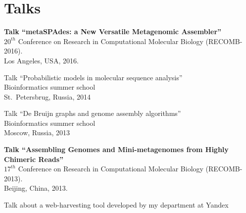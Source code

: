 \section{Talks} %
\begin{innerlist}
 \item \textbf{Talk ``metaSPAdes: a New Versatile Metagenomic Assembler''}\\
       $20^{th}$ Conference on Research in Computational Molecular Biology (RECOMB-2016).\\ 
       Los Angeles, USA, 2016.
 \item Talk ``Probabilistic models in molecular sequence analysis''\\
       Bioinformatics summer school\\
       St.~Petersbrug, Russia, 2014
 \item Talk ``De Bruijn graphs and genome assembly algorithms''\\
       Bioinformatics summer school\\
       Moscow, Russia, 2013
 \item \textbf{Talk ``Assembling Genomes and Mini-metagenomes from Highly Chimeric Reads''}\\
       $17^{th}$ Conference on Research in Computational Molecular Biology (RECOMB-2013).\\ 
       Beijing, China, 2013.
 \item Talk about a web-harvesting tool developed by my department at Yandex\\

\end{innerlist}
